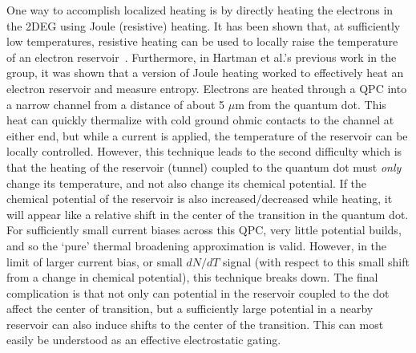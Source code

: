 One way to accomplish localized heating is by directly heating the electrons in the \ac{2DEG} using Joule (resistive) heating. It has been shown that, at sufficiently low temperatures, resistive heating can be used to locally raise the temperature of an electron reservoir~\cite{mittal1996electron}. Furthermore, in Hartman et al.'s previous work in the group, it was shown that a version of Joule heating worked to effectively heat an electron reservoir and measure entropy. Electrons are heated through a \ac{QPC} into a narrow channel from a distance of about 5 $\mu$m from the quantum dot. This heat can quickly thermalize with cold ground ohmic contacts to the channel at either end, but while a current is applied, the temperature of the reservoir can be locally controlled. However, this technique leads to the second difficulty which is that the heating of the reservoir (tunnel) coupled to the quantum dot must \textit{only} change its temperature, and not also change its chemical potential. If the chemical potential of the reservoir is also increased/decreased while heating, it will appear like a relative shift in the center of the transition in the quantum dot. For sufficiently small current biases across this \ac{QPC}, very little potential builds, and so the `pure' thermal broadening approximation is valid. However, in the limit of larger current bias, or small $dN/dT$ signal (with respect to this small shift from a change in chemical potential), this technique breaks down. The final complication is that not only can potential in the reservoir coupled to the dot affect the center of transition, but a sufficiently large potential in a nearby reservoir can also induce shifts to the center of the transition. This can most easily be understood as an effective electrostatic gating. 

